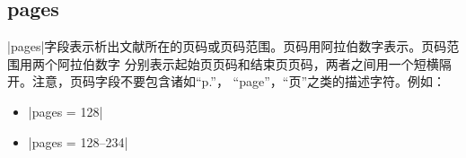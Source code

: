 
\subsection{pages}\label{subsec:bibfield-pages}

|pages|字段表示析出文献所在的页码或页码范围。页码用阿拉伯数字表示。页码范围用两个阿拉伯数字
分别表示起始页页码和结束页页码，两者之间用一个短横隔开。注意，页码字段不要包含诸如``p.''，
``page''，``页''之类的描述字符。例如：
\begin{itemize}
\item |pages = {128}|
\item |pages = {128--234}|
\end{itemize}
